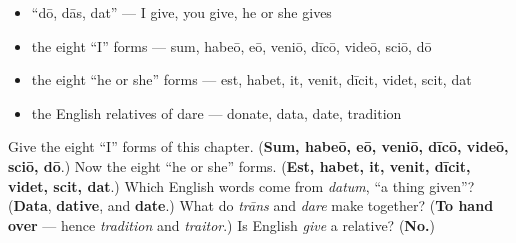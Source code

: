 \begin{itemize}
\raggedright
  \item \textquotedblleft{}dō, dās, dat\textquotedblright{} — I give, you give, he or she gives
  \item the eight \textquotedblleft{}I\textquotedblright{} forms — sum, habeō, eō, veniō, dīcō, videō, sciō, dō
  \item the eight \textquotedblleft{}he or she\textquotedblright{} forms — est, habet, it, venit, dīcit, videt, scit, dat
  \item the English relatives of dare — donate, data, date, tradition
\end{itemize}

\begin{tcolorbox}[breakable,colback=teal!4,colframe=teal!35!black,title={Before you move on}]
Give the eight \textquotedblleft{}I\textquotedblright{} forms of this chapter. (\textbf{Sum, habeō, eō, veniō, dīcō, videō, sciō, dō}.) Now the eight \textquotedblleft{}he or she\textquotedblright{} forms. (\textbf{Est, habet, it, venit, dīcit, videt, scit, dat}.) Which English words come from \emph{datum}, \textquotedblleft{}a thing given\textquotedblright{}? (\textbf{Data}, \textbf{dative}, and \textbf{date}.) What do \emph{trāns} and \emph{dare} make together? (\textbf{To hand over} — hence \emph{tradition} and \emph{traitor}.) Is English \emph{give} a relative? (\textbf{No.})
\end{tcolorbox}

